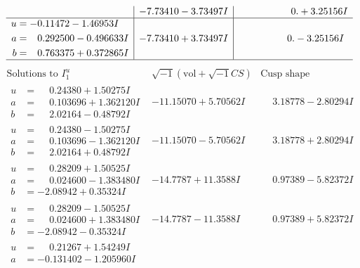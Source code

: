 \documentclass[1p]{elsarticle_modified}
\theoremstyle{definition}
\newcommand{\I}{\sqrt{-1}}
\begin{document}
$$\begin{array}{c|c|c}
 & -7.73410 - 3.73497 I & \phantom{-0.000000 -}0. + 3.25156 I \\ \hline\begin{aligned}
u &= -0.11472 - 1.46953 I \\
a &= \phantom{-}0.292500 - 0.496633 I \\
b &= \phantom{-}0.763375 + 0.372865 I\end{aligned}
 & -7.73410 + 3.73497 I & \phantom{-0.000000 } 0. - 3.25156 I\\
 \hline 
 \end{array}$$\newpage$$\begin{array}{c|c|c}  
\text{Solutions to }I^u_{1}& \I (\text{vol} + \sqrt{-1}CS) & \text{Cusp shape}\\
 \hline 
\begin{aligned}
u &= \phantom{-}0.24380 + 1.50275 I \\
a &= \phantom{-}0.103696 + 1.362120 I \\
b &= \phantom{-}2.02164 - 0.48792 I\end{aligned}
 & -11.15070 + 5.70562 I & \phantom{-}3.18778 - 2.80294 I \\ \hline\begin{aligned}
u &= \phantom{-}0.24380 - 1.50275 I \\
a &= \phantom{-}0.103696 - 1.362120 I \\
b &= \phantom{-}2.02164 + 0.48792 I\end{aligned}
 & -11.15070 - 5.70562 I & \phantom{-}3.18778 + 2.80294 I \\ \hline\begin{aligned}
u &= \phantom{-}0.28209 + 1.50525 I \\
a &= \phantom{-}0.024600 - 1.383480 I \\
b &= -2.08942 + 0.35324 I\end{aligned}
 & -14.7787 + 11.3588 I & \phantom{-}0.97389 - 5.82372 I \\ \hline\begin{aligned}
u &= \phantom{-}0.28209 - 1.50525 I \\
a &= \phantom{-}0.024600 + 1.383480 I \\
b &= -2.08942 - 0.35324 I\end{aligned}
 & -14.7787 - 11.3588 I & \phantom{-}0.97389 + 5.82372 I \\ \hline\begin{aligned}
u &= \phantom{-}0.21267 + 1.54249 I \\
a &= -0.131402 - 1.205960 I \\

\end{aligned}
\end{array}$$
\end{document}
